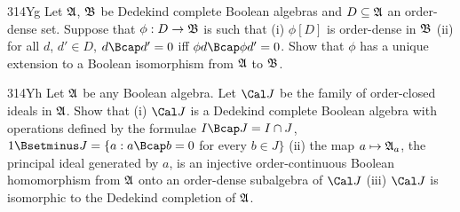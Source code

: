 {\spheader 314Yg Let $\frak A$, $\frak B$ be Dedekind complete Boolean
algebras and $D\subseteq\frak A$ an order-dense set.
Suppose that $\phi:D\to\frak B$ is such that (i) $\phi[D]$ is
order-dense in $\frak B$ (ii) for all $d$, $d'\in D$, $d\Bcap d'=0$ iff
$\phi d\Bcap\phi d'=0$.   Show that $\phi$ has a unique extension to a
Boolean isomorphism from $\frak A$ to $\frak B$.

\spheader 314Yh Let $\frak A$ be any Boolean algebra.   Let $\Cal J$ be
the family of order-closed ideals in $\frak A$.   Show that (i) $\Cal J$
is a Dedekind complete Boolean algebra with operations defined by the
formulae $I\Bcap J=I\cap J$,
$1\Bsetminus J=\{a:a\Bcap b=0$ for every $b\in J\}$ (ii) the map
$a\mapsto \frak A_a$, the principal ideal generated by $a$, is an
injective order-continuous Boolean homomorphism from $\frak A$ onto an
order-dense subalgebra of $\Cal J$ (iii) $\Cal J$ is isomorphic to the
Dedekind completion of $\frak A$.
}%

